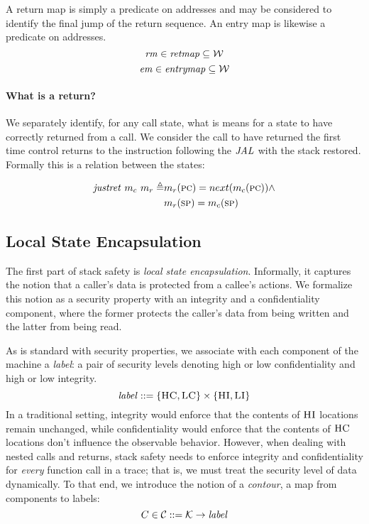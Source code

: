 \documentclass[acmsmall,review,anonymous]{acmart}\settopmatter{printfolios=true,printccs=false,printacmref=false}
\begin{document}
A return map is simply a predicate on addresses and may be considered
to identify the final jump of the return sequence. An entry map is
likewise a predicate on addresses.
\[\mathit{rm} \in \mathit{retmap} \subseteq {\mathcal W}\]
\[\mathit{em} \in \mathit{entrymap} \subseteq {\mathcal W}\]


\paragraph*{What is a return?}

We separately identify, for any call state, what is means for a state
to have correctly returned from a call. We consider the call to have
returned the first time control returns to the instruction following
the \(\mathit{JAL}\) with the stack restored. Formally this is a relation
between the states:

\[\begin{split}
    \mathit{justret}\ m_c\ m_r \triangleq & m_r(\textsc{pc}) =
    next(m_c(\textsc{pc})) \land \\ & m_r(\textsc{sp}) = m_c(\textsc{sp})
\end{split}\]


\subsection{Local State Encapsulation}
\label{sec:lse}

The first part of stack safety is {\em local state encapsulation}.
Informally, it captures the notion that a caller's data is
protected from a callee's actions. We formalize this notion
as a security property with an integrity and a confidentiality
component, where the former protects the caller's data from being
written and the latter from being read.

As is standard with security properties, we associate with each
component of the machine a {\em label}: a pair of security levels
denoting high or low confidentiality and high or low integrity.
%
\[\mathit{label} ::= \{\textsc{HC},\textsc{LC}\} \times \{\textsc{HI},\textsc{LI}\}\]
%
In a traditional setting, integrity would enforce that the contents of
$\textsc{HI}$ locations remain unchanged, while confidentiality would
enforce that the contents of $\textsc{HC}$ locations don't influence the
observable behavior. However, when dealing with nested calls and
returns, stack safety needs to enforce integrity and confidentiality
for {\em every} function call in a trace; that is, we must treat the
security level of data dynamically.
%
To that end, we introduce the notion of a {\em contour}, a map from
components to labels:
%
\[C \in {\mathcal C} ::= {\mathcal K} \rightarrow \mathit{label}\]
\end{document}
